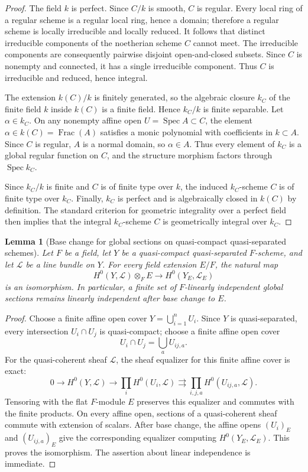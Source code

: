 \documentclass{lms}
\newtheorem{lemma}[theorem]{Lemma}
\DeclareMathOperator{\Spec}{Spec}
\begin{document}
\begin{proof}
The field $k$ is perfect.  Since $C/k$ is smooth, $C$ is regular.  Every local ring of a regular scheme is a regular local ring, hence a domain; therefore a regular scheme is locally irreducible and locally reduced.  It follows that distinct irreducible components of the noetherian scheme $C$ cannot meet.  The irreducible components are consequently pairwise disjoint open-and-closed subsets.  Since $C$ is nonempty and connected, it has a single irreducible component.  Thus $C$ is irreducible and reduced, hence integral.

The extension $k(C)/k$ is finitely generated, so the algebraic closure $k_C$ of the finite field $k$ inside $k(C)$ is a finite field.  Hence $k_C/k$ is finite separable.  Let $\alpha\in k_C$.  On any nonempty affine open $U=\Spec A\subset C$, the element $\alpha\in k(C)=\operatorname{Frac}(A)$ satisfies a monic polynomial with coefficients in $k\subset A$.  Since $C$ is regular, $A$ is a normal domain, so $\alpha\in A$.  Thus every element of $k_C$ is a global regular function on $C$, and the structure morphism factors through $\Spec k_C$.

Since $k_C/k$ is finite and $C$ is of finite type over $k$, the induced $k_C$-scheme $C$ is of finite type over $k_C$.  Finally, $k_C$ is perfect and is algebraically closed in $k(C)$ by definition.  The standard criterion for geometric integrality over a perfect field then implies that the integral $k_C$-scheme $C$ is geometrically integral over $k_C$.
\end{proof}

\begin{lemma}[Base change for global sections on quasi-compact quasi-separated schemes]\label{lem:H0-base-change}
Let $F$ be a field, let $Y$ be a quasi-compact quasi-separated $F$-scheme, and let $\mathcal L$ be a line bundle on $Y$.  For every field extension $E/F$, the natural map
\[
        H^0(Y,\mathcal L)\otimes_F E
        \longrightarrow
        H^0(Y_E,\mathcal L_E)
\]
is an isomorphism.  In particular, a finite set of $F$-linearly independent global sections remains linearly independent after base change to $E$.
\end{lemma}

\begin{proof}
Choose a finite affine open cover $Y=\bigcup_{i=1}^n U_i$.  Since $Y$ is quasi-separated, every intersection $U_i\cap U_j$ is quasi-compact; choose a finite affine open cover
\[
        U_i\cap U_j=\bigcup_a U_{ij,a}.
\]
For the quasi-coherent sheaf $\mathcal L$, the sheaf equalizer for this finite affine cover is exact:
\[
0\longrightarrow H^0(Y,\mathcal L)
\longrightarrow \prod_i H^0(U_i,\mathcal L)
\rightrightarrows
\prod_{i,j,a}H^0(U_{ij,a},\mathcal L).
\]
Tensoring with the flat $F$-module $E$ preserves this equalizer and commutes with the finite products.  On every affine open, sections of a quasi-coherent sheaf commute with extension of scalars.  After base change, the affine opens $(U_i)_E$ and $(U_{ij,a})_E$ give the corresponding equalizer computing $H^0(Y_E,\mathcal L_E)$.  This proves the isomorphism.  The assertion about linear independence is immediate.
\end{proof}
\end{document}
